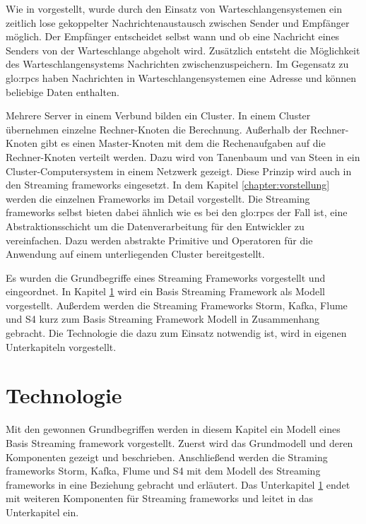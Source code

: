Wie in  vorgestellt, wurde durch den Einsatz von Warteschlangensystemen ein zeitlich lose gekoppelter Nachrichtenaustausch zwischen Sender und Empfänger möglich. Der Empfänger entscheidet selbst wann und ob eine Nachricht eines Senders von der Warteschlange abgeholt wird. Zusätzlich entsteht die Möglichkeit des Warteschlangensystems Nachrichten zwischenzuspeichern. Im Gegensatz zu \glspl{glo:rpc} haben Nachrichten in Warteschlangensystemen eine Adresse und können beliebige Daten enthalten. 

Mehrere Server in einem Verbund bilden ein Cluster. In einem Cluster übernehmen einzelne Rechner-Knoten die Berechnung. Außerhalb der Rechner-Knoten gibt es einen Master-Knoten mit dem die Rechenaufgaben auf die Rechner-Knoten verteilt werden. Dazu wird von Tanenbaum und van Steen in  ein Cluster-Computersystem in einem Netzwerk gezeigt. Diese Prinzip wird auch in den Streaming frameworks eingesetzt. In dem Kapitel \ref{chapter:vorstellung} werden die einzelnen Frameworks im Detail vorgestellt. Die Streaming frameworks selbst bieten dabei ähnlich wie es bei den \glspl{glo:rpc} der Fall ist, eine Abstraktionsschicht um die Datenverarbeitung für den Entwickler zu vereinfachen. Dazu werden abstrakte Primitive und Operatoren für die Anwendung auf einem unterliegenden Cluster bereitgestellt.

Es wurden die Grundbegriffe eines Streaming Frameworks vorgestellt und eingeordnet. In Kapitel \ref{section:technologie} wird ein Basis Streaming Framework als Modell vorgestellt. Außerdem werden die Streaming Frameworks Storm, Kafka, Flume und S4 kurz zum Basis Streaming Framework Modell in Zusammenhang gebracht. Die Technologie die dazu zum Einsatz notwendig ist, wird in eigenen Unterkapiteln vorgestellt.

\section{Technologie}
\label{section:technologie}

Mit den gewonnen Grundbegriffen werden in diesem Kapitel ein Modell eines Basis Streaming framework vorgestellt. Zuerst wird das Grundmodell und deren Komponenten gezeigt und beschrieben. Anschließend werden die Straming frameworks Storm, Kafka, Flume und S4 mit dem Modell des Streaming frameworks in eine Beziehung gebracht und erläutert. Das Unterkapitel \ref{section:technologie} endet mit weiteren Komponenten für Streaming frameworks und leitet in das Unterkapitel  ein.

